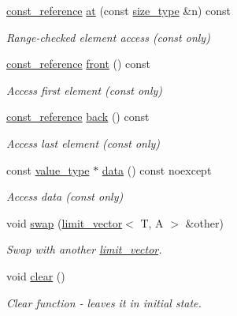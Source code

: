 \begin{DoxyCompactItemize}
\hyperlink{classIceBRG_1_1limit__vector_aed6fc504d7987040be16d150089c7893}{const\+\_\+reference} \hyperlink{classIceBRG_1_1limit__vector_a6353bec6a3ab558a50fe9255e9ace992}{at} (const \hyperlink{classIceBRG_1_1limit__vector_a81be3eb6cd519b3f5279ef735ccc4c2f}{size\+\_\+type} \&n) const 
\begin{DoxyCompactList}\small\item\em Range-\/checked element access (const only) \end{DoxyCompactList}\item 
\hyperlink{classIceBRG_1_1limit__vector_aed6fc504d7987040be16d150089c7893}{const\+\_\+reference} \hyperlink{classIceBRG_1_1limit__vector_a5c0fe22ffdce8122100cf24d0f8daf98}{front} () const 
\begin{DoxyCompactList}\small\item\em Access first element (const only) \end{DoxyCompactList}\item 
\hyperlink{classIceBRG_1_1limit__vector_aed6fc504d7987040be16d150089c7893}{const\+\_\+reference} \hyperlink{classIceBRG_1_1limit__vector_a6b64da787bb41c0da27e6ae6cd82fee2}{back} () const 
\begin{DoxyCompactList}\small\item\em Access last element (const only) \end{DoxyCompactList}\item 
const \hyperlink{classIceBRG_1_1limit__vector_a9b1e2f022c18b0227b25bb571741bb28}{value\+\_\+type} $\ast$ \hyperlink{classIceBRG_1_1limit__vector_a67977f6da2aeab8ef1d77dcc0fe9bebb}{data} () const  noexcept
\begin{DoxyCompactList}\small\item\em Access data (const only) \end{DoxyCompactList}\item 
void \hyperlink{classIceBRG_1_1limit__vector_a35083732ec606851566d3ca6c56769a3}{swap} (\hyperlink{classIceBRG_1_1limit__vector}{limit\+\_\+vector}$<$ T, A $>$ \&other)
\begin{DoxyCompactList}\small\item\em Swap with another \hyperlink{classIceBRG_1_1limit__vector}{limit\+\_\+vector}. \end{DoxyCompactList}\item 
void \hyperlink{classIceBRG_1_1limit__vector_a1b2f88e47b1db40b5ae72ba560b584bc}{clear} ()
\begin{DoxyCompactList}\small\item\em Clear function -\/ leaves it in initial state. \end{DoxyCompactList}\item 

\end{DoxyCompactItemize}
